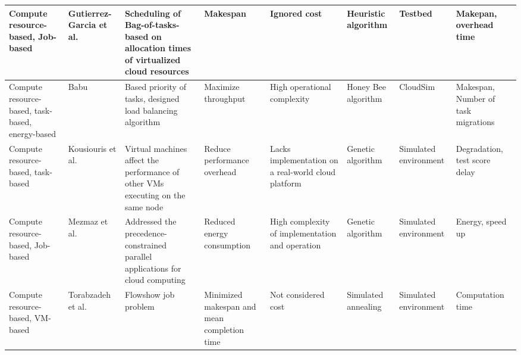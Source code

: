 \begin{sidewaystable*}[!htbp]
{\begin{tabular}{|g{2cm} p{2cm} p{2cm} p{2cm} p{2cm} p{2cm} p{2cm} p{2cm}|}
 Compute resource-based, Job-based & Gutierrez-Garcia et al.~\cite{gutierrez2013family} & Scheduling of Bag-of-tasks-based on allocation times of virtualized cloud resources & Makespan & Ignored cost & Heuristic algorithm &  Testbed & Makepan, overhead time
\\ \hline

Compute resource-based, task-based, energy-based & Babu~\cite{ld2013honey} & Based  priority of tasks, designed load balancing algorithm & Maximize throughput & High operational complexity & Honey Bee algorithm & CloudSim & Makespan, Number of task migrations
\\ \hline

Compute resource-based, task-based & Kousiouris et al.~\cite{kousiouris2011effects}& Virtual machines affect the performance of other VMs executing on the same node & Reduce performance overhead & Lacks implementation on a real-world cloud platform  & Genetic algorithm  &  Simulated environment & Degradation, test score delay
\\ \hline

Compute resource-based, Job-based & Mezmaz et al.~\cite{mezmaz2011parallel} & Addressed the precedence-constrained parallel applications for cloud computing & Reduced energy consumption & High complexity of implementation and operation& Genetic algorithm & Simulated environment & Energy, speed up
\\ \hline


Compute resource-based, VM-based & Torabzadeh et al.~\cite{torabzadeh2010cloud} & Flowshow job problem  & Minimized makespan and mean completion time & Not considered cost & Simulated annealing & Simulated environment & Computation time
\\ \hline


\end{tabular}
}

\end{sidewaystable*}
